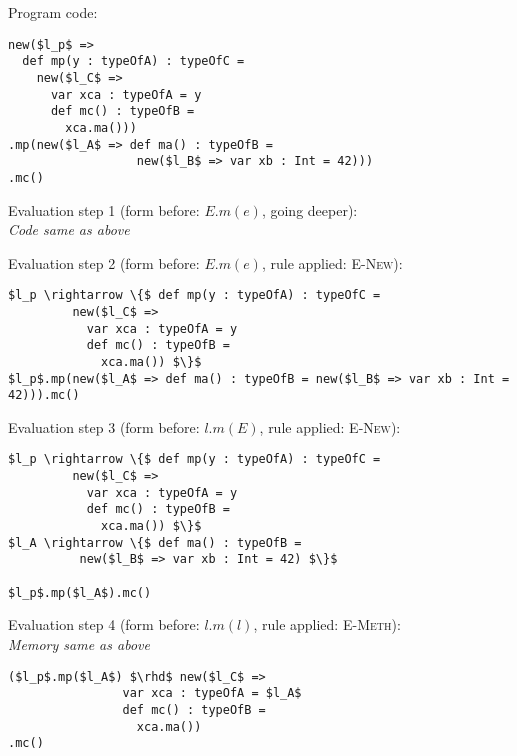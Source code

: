 \documentclass{llncs}
\begin{document}
\noindent Program code:
\vspace{-6pt}
\begin{lstlisting}[xleftmargin=20pt]
new($l_p$ =>
  def mp(y : typeOfA) : typeOfC =
    new($l_C$ =>
      var xca : typeOfA = y
      def mc() : typeOfB =
        xca.ma()))
.mp(new($l_A$ => def ma() : typeOfB =
                  new($l_B$ => var xb : Int = 42)))
.mc()
\end{lstlisting}

\vspace{12pt}
\noindent Evaluation step 1 (form before: $E.m(e)$, going deeper):\\
\indent\textit{Code same as above}

\vspace{12pt}
\noindent Evaluation step 2 (form before: $E.m(e)$, rule applied: \textsc{E-New}):
\vspace{-6pt}
\begin{lstlisting}[xleftmargin=20pt]
$l_p \rightarrow \{$ def mp(y : typeOfA) : typeOfC =
         new($l_C$ =>
           var xca : typeOfA = y
           def mc() : typeOfB =
             xca.ma()) $\}$
$l_p$.mp(new($l_A$ => def ma() : typeOfB = new($l_B$ => var xb : Int = 42))).mc()
\end{lstlisting}

\vspace{12pt}
\noindent Evaluation step 3 (form before: $l.m(E)$, rule applied: \textsc{E-New}):
\vspace{-6pt}
\begin{lstlisting}[xleftmargin=20pt]
$l_p \rightarrow \{$ def mp(y : typeOfA) : typeOfC =
         new($l_C$ =>
           var xca : typeOfA = y
           def mc() : typeOfB =
             xca.ma()) $\}$
$l_A \rightarrow \{$ def ma() : typeOfB =
          new($l_B$ => var xb : Int = 42) $\}$

$l_p$.mp($l_A$).mc()
\end{lstlisting}

\vspace{12pt}
\noindent Evaluation step 4 (form before: $l.m(l)$, rule applied: \textsc{E-Meth}):\\
\vspace{-6pt}
\indent\textit{Memory same as above}\\
\vspace{-6pt}
\begin{lstlisting}[xleftmargin=20pt]
($l_p$.mp($l_A$) $\rhd$ new($l_C$ =>
                var xca : typeOfA = $l_A$
                def mc() : typeOfB =
                  xca.ma())
.mc()
\end{lstlisting}
\end{document}
